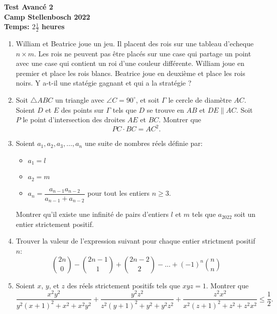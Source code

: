 \documentclass{article}
\begin{document}
\thispagestyle{empty}

\begin{center}
  \textbf{\Large Test Avanc\'e 2}
  \\ \vspace{1em}
  \textbf{\large Camp Stellenbosch 2022}
  \\ \vspace{1em}
  \textbf{\large Temps: $2\frac{1}{2}$ heures}
\end{center}

\bigskip

\vfill

\begin{enumerate}[itemsep=\fill]

\item %
William et Beatrice joue un jeu. Il placent des rois sur une tableau d'echeque $n \times m$. Les rois ne peuvent pas \^etre plac\'es sur une case qui partage un point avec une case qui contient un roi d'une couleur diff\'erente. William joue en premier et place les rois blancs. Beatrice joue en deuxi\`eme et place les rois noirs. Y a-t-il une stat\'egie gagnant et qui a la strat\'egie ?


\item %
Soit $\triangle ABC$ un triangle avec $\angle C = 90^\circ$, et soit $\Gamma$ le cercle de diam\`etre $AC$.
Soient $D$ et $E$ des points sur $\Gamma$ tels que $D$ se trouve en $AB$ et $DE \parallel AC$. Soit $P$ le point d'intersection des droites $AE$ et $BC$.
Montrer que
\[ PC \cdot BC = AC^2. \]

\vspace{0pt}


\item %
Soient $a_1, a_2, a_3, \dots, a_n$ une suite de nombres r\'eels d\'efinie par:
\begin{itemize}
	\item $a_1 = l$
	\item $a_2 = m$
	\item $a_n = \dfrac{a_{n-1}a_{n-2}}{a_{n-1}+a_{n-2}}$ pour tout les entiers $n \geq 3$.
\end{itemize}
Montrer qu'il existe une infinit\'e de pairs d'entiers $l$ et $m$ tels que $a_{2022}$ soit un entier strictement positif.


\item %
Trouver la valeur de l'expression suivant pour chaque entier strictment positif $n$:
\[ {2n \choose 0} -{2n-1 \choose 1}+{2n-2 \choose 2}-...+(-1)^n{n \choose n} \]

\vspace{0pt}


\item %
Soient $x$, $y$, et $z$ des r\'eels strictement positifs tels que $xyz = 1$. Montrer que
\[ \frac{x^2y^2}{y^2(x+1)^2+x^2+x^2y^2} +\frac{y^2z^2}{z^2(y+1)^2+y^2+y^2z^2} +\frac{z^2x^2}{x^2(z+1)^2+z^2+z^2x^2} \leq \frac{1}{2}. \]

\end{enumerate}
\end{document}
